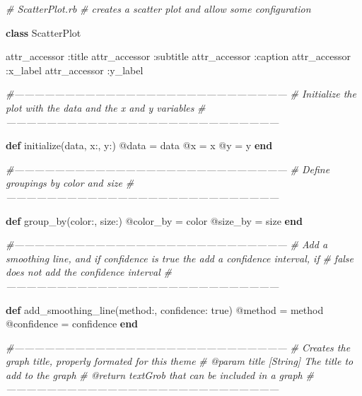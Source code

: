 \documentclass[11pt,]{article}
\newenvironment{Shaded}{\begin{snugshade}}{\end{snugshade}}
\newcommand{\KeywordTok}[1]{\textcolor[rgb]{0.13,0.29,0.53}{\textbf{#1}}}
\newcommand{\DataTypeTok}[1]{\textcolor[rgb]{0.13,0.29,0.53}{#1}}
\newcommand{\DecValTok}[1]{\textcolor[rgb]{0.00,0.00,0.81}{#1}}
\newcommand{\StringTok}[1]{\textcolor[rgb]{0.31,0.60,0.02}{#1}}
\newcommand{\CommentTok}[1]{\textcolor[rgb]{0.56,0.35,0.01}{\textit{#1}}}
\newcommand{\OtherTok}[1]{\textcolor[rgb]{0.56,0.35,0.01}{#1}}
\newcommand{\NormalTok}[1]{#1}
\begin{document}
\begin{Shaded}
\begin{Highlighting}[]
\CommentTok{# ScatterPlot.rb}
\CommentTok{# creates a scatter plot and allow some configuration}
    
\KeywordTok{class} \DataTypeTok{ScatterPlot}

  \OtherTok{attr_accessor} \StringTok{:title}
  \OtherTok{attr_accessor} \StringTok{:subtitle}
  \OtherTok{attr_accessor} \StringTok{:caption}
  \OtherTok{attr_accessor} \StringTok{:x_label}
  \OtherTok{attr_accessor} \StringTok{:y_label}
  
  \CommentTok{#---------------------------------------------------------------------------------}
  \CommentTok{# Initialize the plot with the data and the x and y variables}
  \CommentTok{#---------------------------------------------------------------------------------}

  \KeywordTok{def}\NormalTok{ initialize(data, x:, y:)}
    \OtherTok{@data}\NormalTok{ = data}
    \OtherTok{@x}\NormalTok{ = x}
    \OtherTok{@y}\NormalTok{ = y}
  \KeywordTok{end}
  
  \CommentTok{#---------------------------------------------------------------------------------}
  \CommentTok{# Define groupings by color and size}
  \CommentTok{#---------------------------------------------------------------------------------}

  \KeywordTok{def}\NormalTok{ group_by(color:, size:)}
    \OtherTok{@color_by}\NormalTok{ = color}
    \OtherTok{@size_by}\NormalTok{ = size}
  \KeywordTok{end}

  \CommentTok{#---------------------------------------------------------------------------------}
  \CommentTok{# Add a smoothing line, and if confidence is true the add a confidence interval, if}
  \CommentTok{# false does not add the confidence interval}
  \CommentTok{#---------------------------------------------------------------------------------}

  \KeywordTok{def}\NormalTok{ add_smoothing_line(method:, }\StringTok{confidence: }\DecValTok{true}\NormalTok{)}
    \OtherTok{@method}\NormalTok{ = method}
    \OtherTok{@confidence}\NormalTok{ = confidence}
  \KeywordTok{end}
  
  \CommentTok{#---------------------------------------------------------------------------------}
  \CommentTok{# Creates the graph title, properly formated for this theme}
  \CommentTok{# @param title [String] The title to add to the graph}
  \CommentTok{# @return textGrob that can be included in a graph}
  \CommentTok{#---------------------------------------------------------------------------------}


\end{Highlighting}
\end{Shaded}
\end{document}

